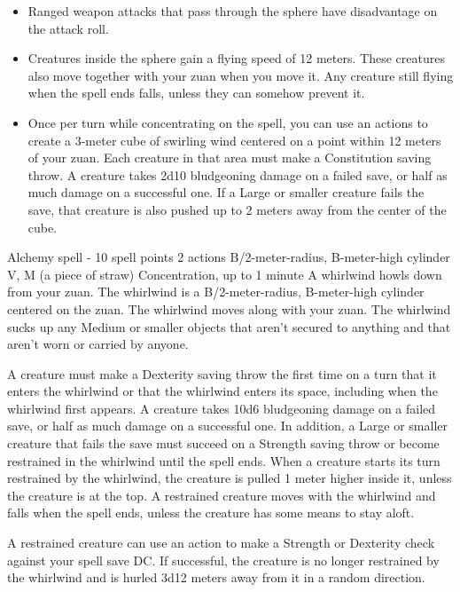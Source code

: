         \begin{itemize}
            \item Ranged weapon attacks that pass through the sphere have disadvantage on the attack roll.
            \item Creatures inside the sphere gain a flying speed of 12 meters.
            These creatures also move together with your zuan when you move it.
            Any creature still flying when the spell ends falls, unless they can somehow prevent it.
            \item Once per turn while concentrating on the spell, you can use an actions to create a 3-meter cube of swirling wind centered on a point within 12 meters of your zuan.
            Each creature in that area must make a Constitution saving throw.
            A creature takes 2d10 bludgeoning damage on a failed save, or half as much damage on a successful one.
            If a Large or smaller creature fails the save, that creature is also pushed up to 2 meters away from the center of the cube.
        \end{itemize}
        {Alchemy spell - 10 spell points}
        {2 actions}
        {B/2-meter-radius, B-meter-high cylinder}
        {V, M (a piece of straw)}
        {Concentration, up to 1 minute}
        A whirlwind howls down from your zuan.
        The whirlwind is a B/2-meter-radius, B-meter-high cylinder centered on the zuan.
        The whirlwind moves along with your zuan.
        The whirlwind sucks up any Medium or smaller objects that aren't secured to anything and that aren't worn or carried by anyone.

        A creature must make a Dexterity saving throw the first time on a turn that it enters the whirlwind or that the whirlwind enters its space, including when the whirlwind first appears.
        A creature takes 10d6 bludgeoning damage on a failed save, or half as much damage on a successful one.
        In addition, a Large or smaller creature that fails the save must succeed on a Strength saving throw or become restrained in the whirlwind until the spell ends.
        When a creature starts its turn restrained by the whirlwind, the creature is pulled 1 meter higher inside it, unless the creature is at the top.
        A restrained creature moves with the whirlwind and falls when the spell ends, unless the creature has some means to stay aloft.

        A restrained creature can use an action to make a Strength or Dexterity check against your spell save DC.
        If successful, the creature is no longer restrained by the whirlwind and is hurled 3d12 meters away from it in a random direction.
